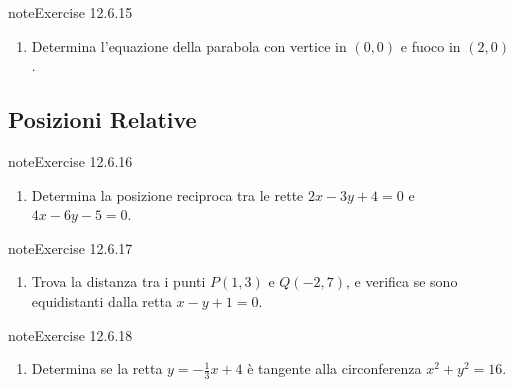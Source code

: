 \documentclass[letterpaper,10pt,italian]{jupyterBook}
\begin{document}
\begin{sphinxadmonition}{note}{Exercise 12.6.15}


\begin{enumerate}
%
\setcounter{enumi}{14}
\item {} 
\sphinxAtStartPar
Determina l’equazione della parabola con vertice in \( (0, 0) \) e fuoco in \( (2, 0) \).

\end{enumerate}
\end{sphinxadmonition}


\subsection{Posizioni Relative}
\label{\detokenize{ch/analytic_geometry/analytic_geometry_2d/problems:posizioni-relative}} \label{exercise:ch/analytic_geometry/analytic_geometry_2d/problems-exercise-15}

\begin{sphinxadmonition}{note}{Exercise 12.6.16}


\begin{enumerate}
%
\setcounter{enumi}{15}
\item {} 
\sphinxAtStartPar
Determina la posizione reciproca tra le rette \( 2x - 3y + 4 = 0 \) e \( 4x - 6y - 5 = 0 \).

\end{enumerate}
\end{sphinxadmonition}
 \label{exercise:ch/analytic_geometry/analytic_geometry_2d/problems-exercise-16}

\begin{sphinxadmonition}{note}{Exercise 12.6.17}


\begin{enumerate}
%
\setcounter{enumi}{16}
\item {} 
\sphinxAtStartPar
Trova la distanza tra i punti \( P(1, 3) \) e \( Q(-2, 7) \), e verifica se sono equidistanti dalla retta \( x - y + 1 = 0 \).

\end{enumerate}
\end{sphinxadmonition}
 \label{exercise:ch/analytic_geometry/analytic_geometry_2d/problems-exercise-17}

\begin{sphinxadmonition}{note}{Exercise 12.6.18}


\begin{enumerate}
%
\setcounter{enumi}{17}
\item {} 
\sphinxAtStartPar
Determina se la retta \( y = -\frac{1}{3}x + 4 \) è tangente alla circonferenza \( x^2 + y^2 = 16 \).

\end{enumerate}
\end{sphinxadmonition}
 \label{exercise:ch/analytic_geometry/analytic_geometry_2d/problems-exercise-18}
\end{document}
